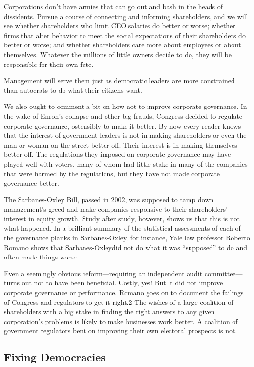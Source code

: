 \documentclass[10pt]{article}
\begin{document}
{\large Corporations don't have armies that can go out and bash in the heads of
dissidents. Pursue a course of connecting and informing shareholders, and we will
see whether shareholders who limit CEO salaries do better or worse; whether firms
that alter behavior to meet the social expectations of their shareholders do
better or worse; and whether shareholders care more about employees or about
themselves. Whatever the millions of little owners decide to do, they will be
responsible for their own fate.}

{\large Management will serve them just as democratic leaders are more
constrained than autocrats to do what their citizens want.}

{\large We also ought to comment a bit on how not to improve corporate
governance. In the wake of Enron's collapse and other big frauds, Congress
decided to regulate corporate governance, ostensibly to make it better. By now
every reader knows that the interest of government leaders is not in making
shareholders or even the man or woman on the street better off. Their interest is
in making themselves better off. The regulations they imposed on corporate
governance may have played well with voters, many of whom had little stake in
many of the companies that were harmed by the regulations, but they have not made
corporate governance better.}

{\large The Sarbanes-Oxley Bill, passed in 2002, was supposed to tamp down
management's greed and make companies responsive to their shareholders' interest
in equity growth. Study after study, however, shows us that this is not what
happened. In a brilliant summary of the statistical assessments of each of the
governance planks in Sarbanes-Oxley, for instance, Yale law professor Roberto
Romano shows that Sarbanes-Oxleydid not do what it was ``supposed'' to do and
often made things worse.}

{\large Even a seemingly obvious reform---requiring an independent audit
committee---turns out not to have been beneficial. Costly, yes! But it did not
improve corporate governance or performance. Romano goes on to document the
failings of Congress and regulators to get it right.2 The wishes of a large
coalition of shareholders with a big stake in finding the right answers to any
given corporation's problems is likely to make businesses work better. A
coalition of government regulators bent on improving their own electoral
prospects is not.}

\subsection{Fixing Democracies}
\end{document}
